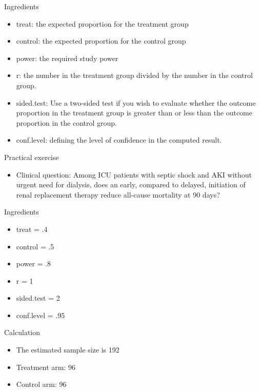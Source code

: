 \documentclass[
  14pt,
  ignorenonframetext,
  aspectratio=169,
]{beamer}
\providecommand{\tightlist}{%
  \setlength{\itemsep}{0pt}\setlength{\parskip}{0pt}}
\begin{document}
\begin{frame}{Ingredients}
\protect{}\label{ingredients}
\begin{itemize}
\item
  treat: the expected proportion for the treatment group
\item
  control: the expected proportion for the control group
\item
  power: the required study power
\item
  r: the number in the treatment group divided by the number in the
  control group.
\item
  sided.test: Use a two-sided test if you wish to evaluate whether the
  outcome proportion in the treatment group is greater than or less than
  the outcome proportion in the control group.
\item
  conf.level: defining the level of confidence in the computed result.
\end{itemize}
\end{frame}

\begin{frame}{Practical exercise}
\protect{}\label{practical-exercise}
\begin{itemize}
\tightlist
\item
  Clinical question: Among ICU patients with septic shock and AKI
  without urgent need for dialysis, does an early, compared to delayed,
  initiation of renal replacement therapy reduce all-cause mortality at
  90 days?
\end{itemize}
\end{frame}

\begin{frame}{Ingredients}
\protect{}\label{ingredients-1}
\begin{itemize}
\item
  treat = .4
\item
  control = .5
\item
  power = .8
\item
  r = 1
\item
  sided.test = 2
\item
  conf.level = .95
\end{itemize}
\end{frame}

\begin{frame}{Calculation}
\protect{}\label{calculation}
\begin{itemize}
\item
  The estimated sample size is 192
\item
  Treatment arm: 96
\item
  Control arm: 96
\end{itemize}
\end{frame}
\end{document}
